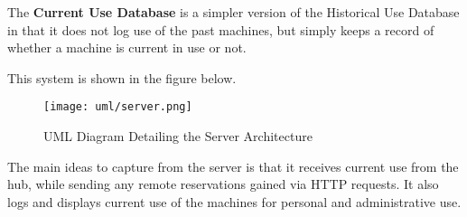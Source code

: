 \documentclass[PPFS.tex]{template/subfiles}
\begin{document}
The \textbf{Current Use Database} is a simpler version of the Historical Use Database in that it does not log use of the past machines, but simply keeps a record of whether a machine is current in use or not.

This system is shown in the figure below.

\begin{figure}[H]
    \centering
    \texttt{[image: uml/server.png]}
    \caption{UML Diagram Detailing the Server Architecture}
\end{figure}

The main ideas to capture from the server is that it receives current use from the hub, while sending any remote reservations gained via HTTP requests. It also logs and displays current use of the machines for personal and administrative use.
\end{document}
